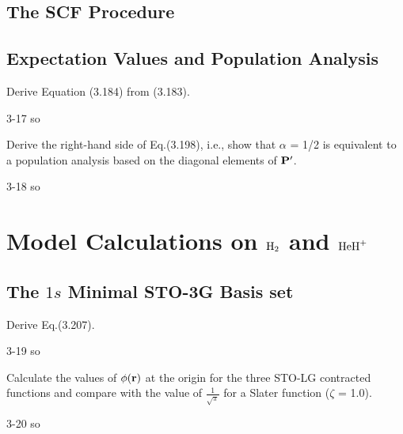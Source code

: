 \documentclass[a4paper]{book}
\begin{document}
	\subsection{The SCF Procedure}
	
	\subsection{Expectation Values and Population Analysis}
	
	\begin{exercise}
	Derive Equation (3.184) from (3.183).
	\end{exercise}
	
	\begin{solution}
		3-17 so
	\end{solution}
	
	\begin{exercise}
	Derive the right-hand side of Eq.(3.198), i.e., show that $\alpha$ = 1/2 is equivalent to a population analysis based on the diagonal elements of ${\bf P}^\prime$.
	\end{exercise}
	
	\begin{solution}
		3-18 so
	\end{solution}
	
	\section{Model Calculations on \texorpdfstring{$\ce{H2}$}- and \texorpdfstring{$\ce{HeH+}$}-}
	
	\subsection{The \texorpdfstring{$1s$}- Minimal STO-3G Basis set}
	
	\begin{exercise}
	Derive Eq.(3.207).
	\end{exercise}
	
	\begin{solution}
		3-19 so
	\end{solution}
	
	\begin{exercise}
	Calculate the values of $\phi({\bf r})$ at the origin for the three STO-LG contracted functions and compare with the value of $\frac{1}{\sqrt{ \pi }}$ for a Slater function ($\zeta$ = 1.0).
	\end{exercise}
	
	\begin{solution}
		3-20 so
	\end{solution}
	
\end{document}
